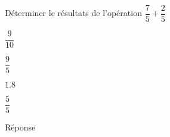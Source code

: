\begin{exercice}
    Déterminer le résultats de l'opération $\dfrac{7}{5}+\dfrac{2}{5}$
    \begin{ChoixQCM}{4}
        \item $\dfrac{9}{10}$
        \item $\dfrac{9}{5}$
        \item $\num{1.8}$
        \item $\dfrac{5}{5}$
    \end{ChoixQCM}
\end{exercice}
\begin{corrige}
    Réponse  
\end{corrige}